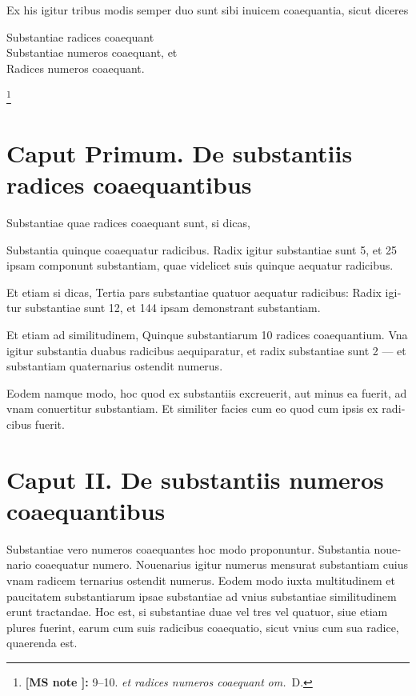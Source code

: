 \documentclass[11pt,a4paper]{book}
\newcounter{critnotectr}
\newcommand{\critnote}[1]{\stepcounter{critnotectr}\textsuperscript{\tiny\textcolor{criticalnote}{\thecritnotectr}}\footnote{\tiny\textcolor{criticalnote}{\textbf{[MS note \thecritnotectr]:} #1}}}
\newcommand{\om}{\textit{om.}}
\begin{document}
\smallskip

\textlatin{Ex his igitur tribus modis semper duo sunt sibi inuicem coaequantia, sicut diceres}

\begin{center}
\textlatin{Substantiae radices coaequant}\\
\textlatin{Substantiae numeros coaequant, et}\\
\textlatin{Radices numeros coaequant.}
\end{center}

\critnote{9--10. \textit{et radices numeros coaequant} \om\ D.}

\vspace{0.5cm}

\section*{Caput Primum. De substantiis radices coaequantibus}

\textlatin{Substantiae quae radices coaequant sunt, si dicas,}

\textlatin{Substantia quinque coaequatur radicibus. Radix igitur substantiae sunt 5, et 25 ipsam componunt substantiam, quae videlicet suis quinque aequatur radicibus.}

\textlatin{Et etiam si dicas, Tertia pars substantiae quatuor aequatur radicibus: Radix igitur substantiae sunt 12, et 144 ipsam demonstrant substantiam.}

\textlatin{Et etiam ad similitudinem, Quinque substantiarum 10 radices coaequantium. Vna igitur substantia duabus radicibus aequiparatur, et radix substantiae sunt 2 --- et substantiam quaternarius ostendit numerus.}

\textlatin{Eodem namque modo, hoc quod ex substantiis excreuerit, aut minus ea fuerit, ad vnam conuertitur substantiam. Et similiter facies cum eo quod cum ipsis ex radicibus fuerit.}

\vspace{0.5cm}

\section*{Caput II. De substantiis numeros coaequantibus}

\textlatin{Substantiae vero numeros coaequantes hoc modo proponuntur. Substantia nouenario coaequatur numero. Nouenarius igitur numerus mensurat substantiam cuius vnam radicem ternarius ostendit numerus. Eodem modo iuxta multitudinem et paucitatem substantiarum ipsae substantiae ad vnius substantiae similitudinem erunt tractandae. Hoc est, si substantiae duae vel tres vel quatuor, siue etiam plures fuerint, earum cum suis radicibus coaequatio, sicut vnius cum sua radice, quaerenda est.}
\end{document}
